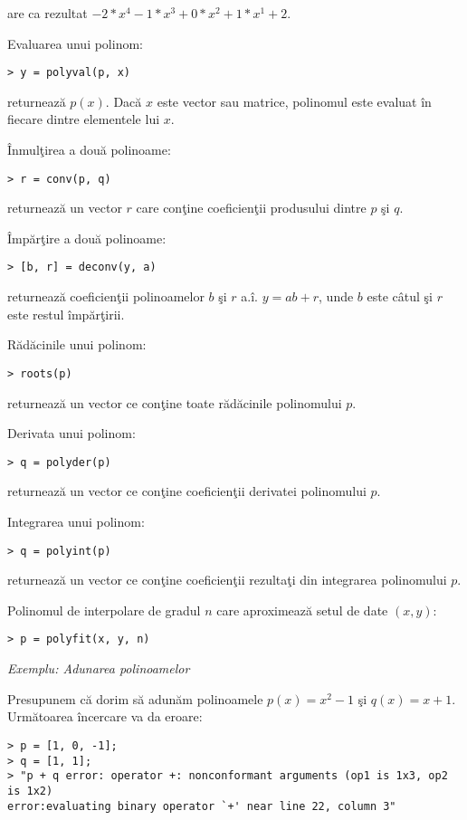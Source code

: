 \documentclass{exam}
\begin{document}
\noindent  are ca rezultat $ -2*x^4 - 1*x^3 + 0*x^2 + 1*x^1 + 2$.

Evaluarea unui polinom:
\begin{verbatim}
> y = polyval(p, x)
\end{verbatim}

\noindent  returnează $p(x)$. Dacă $x$ este vector sau matrice, polinomul este evaluat în fiecare dintre elementele lui $x$.

Înmulţirea a două polinoame:
\begin{verbatim}
> r = conv(p, q)
\end{verbatim}

\noindent  returnează un vector $r$ care conţine coeficienţii produsului dintre $p$ şi $q$.

Împărţire a două polinoame:
\begin{verbatim}
> [b, r] = deconv(y, a)
\end{verbatim}

\noindent returnează coeficienţii polinoamelor $b$ şi $r$ a.î. $y=ab+r$, unde $b$ este câtul şi $r$ este restul împărţirii.

Rădăcinile unui polinom:
\begin{verbatim}
> roots(p)
\end{verbatim}

\noindent returnează un vector ce conţine toate rădăcinile polinomului $p$.

Derivata  unui polinom:
\begin{verbatim}
> q = polyder(p)
\end{verbatim}

\noindent returnează un vector ce conţine coeficienţii derivatei polinomului $p$.

Integrarea  unui polinom:
\begin{verbatim}
> q = polyint(p)
\end{verbatim}

\noindent returnează un vector ce conţine coeficienţii rezultaţi din integrarea polinomului $p$.

Polinomul de interpolare de gradul $n$ care aproximează setul de date $(x,y)$:
\begin{verbatim}
> p = polyfit(x, y, n)
\end{verbatim}

\textit{Exemplu: Adunarea polinoamelor}

Presupunem că dorim să adunăm polinoamele $p(x)=x^{2}-1$ şi $q(x)=x+1$. Următoarea încercare va da eroare:
\begin{verbatim}
> p = [1, 0, -1]; 
> q = [1, 1]; 
> "p + q error: operator +: nonconformant arguments (op1 is 1x3, op2 is 1x2)
error:evaluating binary operator `+' near line 22, column 3"
\end{verbatim}
\end{document}
